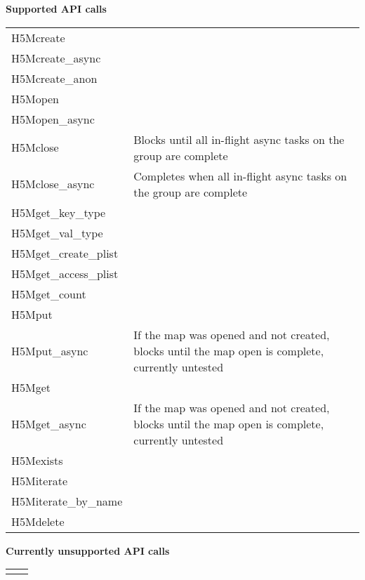 \documentclass[../users_guide.tex]{subfiles}
\begin{document}
\begin{center}

\textbf{Supported API calls}
\vspace{.2in} \\

\begin{tabularx}{\linewidth}{| X | >{\RaggedRight}X |}
\hline
\rowcolor{lightgray!50}%
\multicolumn{1}{| c |}{\textbf{API call}} & \multicolumn{1}{c |}{\textbf{Notes}} \\ \hline

H5Mcreate & \\ \hline
H5Mcreate\_async & \\ \hline
H5Mcreate\_anon & \\ \hline
H5Mopen & \\ \hline
H5Mopen\_async & \\ \hline
H5Mclose & Blocks until all in-flight async tasks on the group are complete\\ \hline
H5Mclose\_async & Completes when all in-flight async tasks on the group are complete\\ \hline
H5Mget\_key\_type & \\ \hline
H5Mget\_val\_type & \\ \hline
H5Mget\_create\_plist & \\ \hline
H5Mget\_access\_plist & \\ \hline
H5Mget\_count & \\ \hline
H5Mput & \\ \hline
H5Mput\_async & If the map was opened and not created, blocks until the map open is complete, currently untested\\ \hline
H5Mget & \\ \hline
H5Mget\_async & If the map was opened and not created, blocks until the map open is complete, currently untested\\ \hline
H5Mexists & \\ \hline
H5Miterate & \\ \hline
H5Miterate\_by\_name & \\ \hline
H5Mdelete & \\ \hline

\end{tabularx}

\textbf{Currently unsupported API calls}
\vspace{.2in} \\

\begin{tabularx}{\linewidth}{| X | >{\RaggedRight}X |}
\hline
\rowcolor{lightgray!50}%
\multicolumn{1}{| c |}{\textbf{API call}} & \multicolumn{1}{c |}{\textbf{Notes}} \\ \hline

& \\ \hline

\end{tabularx}

\end{center}
\end{document}
